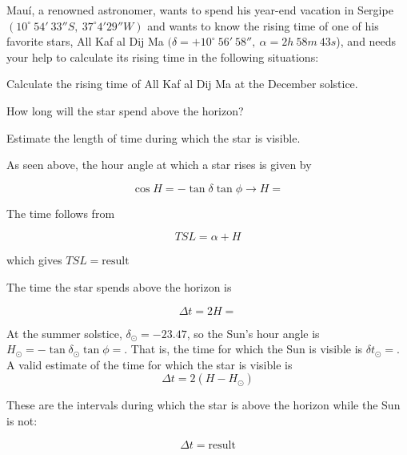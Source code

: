 \documentclass[11pt]{article}
\begin{document}
\begin{pproblem}
    Mauí, a renowned astronomer, wants to spend his year-end vacation in Sergipe \((10^\circ \ 54'\ 33'' S, \ 37^\circ 4'29'' W)\) and wants to know the rising time of one of his favorite stars, All Kaf al Dij Ma  \((\delta = +10^\circ \ 56'\ 58'', \ \alpha = 2h \ 58m \ 43s\)), and needs your help to calculate its rising time in the following situations:
    
    \begin{alternativas}
        \item Calculate the rising time of All Kaf al Dij Ma  at the December solstice.
        \item How long will the star spend above the horizon?
        \item Estimate the length of time during which the star is visible.
    \end{alternativas}

\begin{pssolution*}{}{ }
    \begin{alternativas}
        \item As seen above, the hour angle at which a star rises is given by 

        \[\cos H = - \tan \delta \tan \phi \rightarrow H = \]

        The time follows from 

        \[TSL = \alpha + H\]

        which gives \(\boxed{TSL = \text{result}}\)

        \item The time the star spends above the horizon is 
        
        \[\Delta t = 2 H = \]

        \item At the summer solstice, \(\delta_\odot = -23.47\), so the Sun's hour angle is \(H_\odot = -\tan\delta_\odot \tan\phi = \). That is, the time for which the Sun is visible is \(\delta t_\odot = \). A valid estimate of the time for which the star is visible is 
        \[\Delta t = 2 (H - H_\odot)\]

        These are the intervals during which the star is above the horizon while the Sun is not: 
       
        \[\boxed{\Delta t = \text{result}}\]
    \end{alternativas}
\end{pssolution*}
\end{pproblem}
\end{document}
